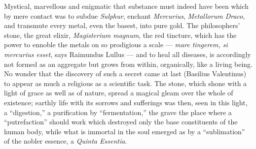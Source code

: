 \documentclass[12pt,a4paper]{book}
\begin{document}
Mystical, marvellous and enigmatic that substance must indeed have been which
by mere contact was to subdue \textit{Sulphur}, enchant \textit{Mercurius},
\textit{Metallorum Draco}, and transmute every metal, even the basest, into
pure gold. The philosophers' stone, the great elixir, \textit{Magisterium
magnum}, the red tincture, which has the power to ennoble the metals on so
prodigious a scale --- \textit{mare tingerem, si mercurius esset}, says
Raimundus Lullus --- and to heal all diseases, is accordingly not formed as an
aggregate but grows from within, organically, like a living being. No wonder
that the discovery of such a secret came at last (Basilius Valentinus) to
appear as much a religious as a scientific
task. The stone, which shone with a light of grace as well as of nature, spread
a magical gleam over the whole of existence; earthly life with its sorrows and
sufferings was then, seen in this light, a ``digestion,'' a purification by
``fermentation,'' the grave the place where a ``putrefaction'' should work
which destroyed only the base constituents of the human body, while what is
immortal in the soul emerged as by a ``sublimation'' of the nobler essence, a
\textit{Quinta Essentia}.
\end{document}
